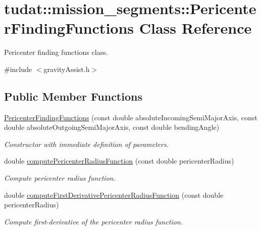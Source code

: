 \hypertarget{classtudat_1_1mission__segments_1_1PericenterFindingFunctions}{}\section{tudat\+:\+:mission\+\_\+segments\+:\+:Pericenter\+Finding\+Functions Class Reference}
\label{classtudat_1_1mission__segments_1_1PericenterFindingFunctions}


Pericenter finding functions class.  




{\ttfamily \#include $<$gravity\+Assist.\+h$>$}

\subsection*{Public Member Functions}
\begin{DoxyCompactItemize}
\item 
\hyperlink{classtudat_1_1mission__segments_1_1PericenterFindingFunctions_a97fb47b1920e4dc1809b760928552bf0}{Pericenter\+Finding\+Functions} (const double absolute\+Incoming\+Semi\+Major\+Axis, const double absolute\+Outgoing\+Semi\+Major\+Axis, const double bending\+Angle)
\begin{DoxyCompactList}\small\item\em Constructor with immediate definition of parameters. \end{DoxyCompactList}\item 
double \hyperlink{classtudat_1_1mission__segments_1_1PericenterFindingFunctions_a59165e752c9250d1e9fa7c2c29699094}{compute\+Pericenter\+Radius\+Function} (const double pericenter\+Radius)
\begin{DoxyCompactList}\small\item\em Compute pericenter radius function. \end{DoxyCompactList}\item 
double \hyperlink{classtudat_1_1mission__segments_1_1PericenterFindingFunctions_a76c0e8b16c404037209233edc85a4e64}{compute\+First\+Derivative\+Pericenter\+Radius\+Function} (const double pericenter\+Radius)
\begin{DoxyCompactList}\small\item\em Compute first-\/derivative of the pericenter radius function. \end{DoxyCompactList}\end{DoxyCompactItemize}


